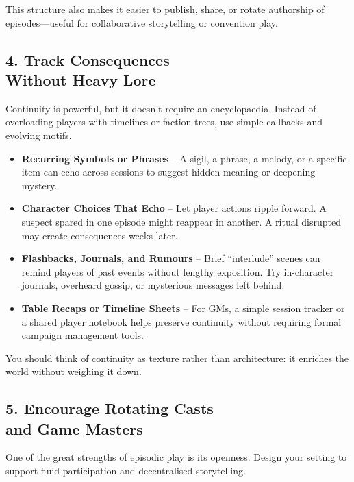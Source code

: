 This structure also makes it easier to publish, share, or rotate authorship of episodes—useful for collaborative storytelling or convention play.

\subsection*{4. Track Consequences\\ Without Heavy Lore}

Continuity is powerful, but it doesn’t require an encyclopaedia. Instead of overloading players with timelines or faction trees, use simple callbacks and evolving motifs.

\begin{itemize}\raggedright
    \item \textbf{Recurring Symbols or Phrases} – A sigil, a phrase, a melody, or a specific item can echo across sessions to suggest hidden meaning or deepening mystery.

    \item \textbf{Character Choices That Echo} – Let player actions ripple forward. A suspect spared in one episode might reappear in another. A ritual disrupted may create consequences weeks later.

    \item \textbf{Flashbacks, Journals, and Rumours} – Brief “interlude” scenes can remind players of past events without lengthy exposition. Try in-character journals, overheard gossip, or mysterious messages left behind.

    \item \textbf{Table Recaps or Timeline Sheets} – For GMs, a simple session tracker or a shared player notebook helps preserve continuity without requiring formal campaign management tools.
\end{itemize}

You should think of continuity as texture rather than architecture: it enriches the world without weighing it down.

\subsection*{5. Encourage Rotating Casts\\ and Game Masters}

One of the great strengths of episodic play is its openness. Design your setting to support fluid participation and decentralised storytelling.

